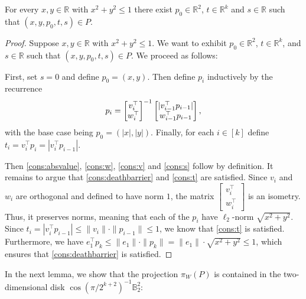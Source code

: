 \documentclass{article}\usepackage[a4paper,margin=20mm]{geometry}
\newcommand{\R}{\mathbb R}
\newcommand{\T}{\top}
\newcommand{\ball}{\mathbb{B}_2}
\DeclarePairedDelimiter\abs{\lvert}{\rvert}
\begin{document}
\begin{lemma}\label{lem:innerdisk}
For every $x,y \in \R$ with $x^2+y^2 \leq 1$ there exist $p_0 \in \R^2$,
$t \in \R^k$ and $s \in \R$ such that $(x,y,p_0,t,s) \in P$.
\end{lemma}
\begin{proof}
    Suppose $x,y \in \mathbb{R}$ with $x^2 + y^2 \le 1$. We want to exhibit $p_0 \in \mathbb{R}^2$, $t \in \mathbb{R}^k$, and $s \in \mathbb{R}$ such that $(x, y, p_0, t, s)\in P$. We proceed as follows:

    First, set $s = 0$ and define $p_0 = (x,y)$. Then define $p_{i}$ inductively by the recurrence 
    \[
    p_{i} = \begin{bmatrix} v_{i}^\top \\  w_{i}^\top \end{bmatrix}^{-1} \begin{bmatrix}\abs{v_{i-1}^{\top}p_{i-1}}\\ w_{i-1}^{\top}p_{i-1} \end{bmatrix},
    \]
    with the base case being $p_{0} = (|x|, |y|)$. Finally, for each $i \in [k]$ define $t_{i} = v_{i}^{\top} p_{i} = |v_{i}^{\top}p_{i-1}|$.

    Then \eqref{cons:absvalue}, \eqref{cons:w}, \eqref{cons:v} and \eqref{cons:s} follow by definition.  It remains to argue that \eqref{cons:deathbarrier} and \eqref{cons:t} are satisfied. Since $v_{i}$ and $w_{i}$ are orthogonal and defined to have norm $1$, the matrix $\begin{bmatrix} v_{i}^\T \\ w_{i}^\T \end{bmatrix}$ is an isometry. Thus, it preserves norms, meaning that each of the $p_{i}$ have $\ell_2$-norm $\sqrt{x^2 + y^2}$.
    Since $t_i = |v_i^\top p_{i-1}| \leq \|v_i\|\cdot \|p_{i-1}\| \leq 1$,
    we know that \eqref{cons:t} is satisfied.
    Furthermore, we have $e_1^\top p_k \leq \|e_1\|\cdot\|p_k\| = \|e_1\| \cdot \sqrt{x^2 + y^2} \leq 1$,
    which ensures that \eqref{cons:deathbarrier} is satisfied.
\end{proof}

In the next lemma, we show that the projection $\pi_W(P)$ is contained in the two-dimensional disk $\cos(\pi/2^{k+2})^{-1}\ball^2$:
\end{document}

